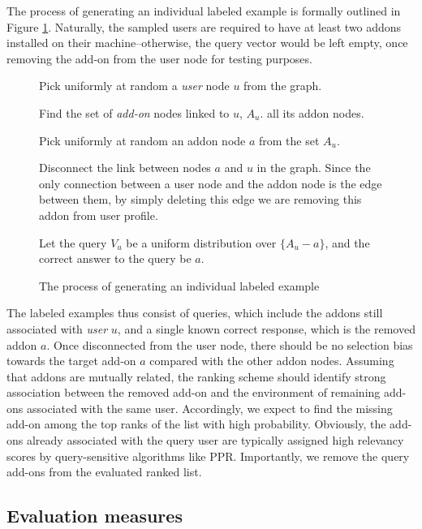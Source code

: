 \documentclass[11pt,oneside]{book}
\let\Oldsubsection\subsection
\renewcommand{\subsection}{\FloatBarrier\Oldsubsection}
\begin{document}
The process of generating an individual labeled example is formally outlined in Figure
\ref{fig:example-gen}. Naturally, the sampled users are required to have at least two addons installed on their machine--otherwise, the query vector would be left empty, once removing the add-on from the user node for testing purposes. 

\begin{figure}
\begin{enumerate}[(a)]
\begin{small}
\item Pick uniformly at random a {\it user} node $u$ from the graph.
\item Find the set of {\it add-on} nodes linked to $u$, $A_u$.
  all its addon nodes.
\item Pick uniformly at random an addon node $a$ from the set $A_u$. 
\item Disconnect the link between nodes $a$ and $u$ in the
  graph. Since the only connection between a user node and the addon
  node is the edge between them, by simply deleting this edge we are
  removing this addon from user profile.
\item Let the query $V_u$ be a uniform distribution over $\{A_u-a\}$,
  and the correct answer to the query be $a$. 
\end{small}
\end{enumerate}
\caption{The process of generating an individual labeled example}
\label{fig:example-gen}
\end{figure}

The labeled examples thus consist of queries, which include the addons still associated with {\it user} $u$, and a single known correct response, which is the removed addon $a$.
Once disconnected from the user node, there should be no selection bias towards the target add-on $a$ compared with the other addon nodes. Assuming that addons are mutually related, the ranking scheme should identify strong association between the removed add-on and the environment of remaining add-ons associated with the same user. Accordingly, we expect to find the missing add-on among the top ranks of the list with high probability. Obviously, the add-ons already associated with the query user are  typically assigned high relevancy scores by query-sensitive algorithms like PPR. Importantly, we remove the query add-ons from the evaluated ranked list. 

\subsection{Evaluation measures}
\end{document}
